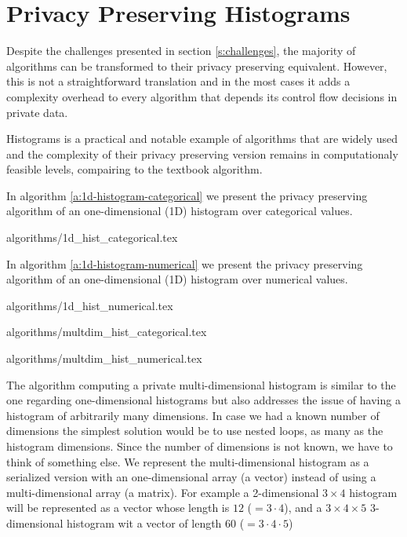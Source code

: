 \section{Privacy Preserving Histograms}\label{s:histograms}
Despite the challenges presented in section \ref{s:challenges}, the majority of algorithms can be transformed to their privacy preserving equivalent.
However, this is not a straightforward translation and in the most cases it adds a complexity overhead to every algorithm that depends its control flow decisions in private data.

Histograms is a practical and notable example of algorithms that are widely used and the complexity of their privacy preserving version remains in computationaly feasible levels, compairing to the textbook algorithm.







In algorithm \ref{a:1d-histogram-categorical} we present the privacy preserving algorithm of an one-dimensional (1D) histogram over categorical values.

{algorithms/1d_hist_categorical.tex}




In algorithm \ref{a:1d-histogram-numerical} we present the privacy preserving algorithm of an one-dimensional (1D) histogram over numerical values.

{algorithms/1d_hist_numerical.tex}




{algorithms/multdim_hist_categorical.tex}




{algorithms/multdim_hist_numerical.tex}

The algorithm computing a private multi-dimensional histogram is similar to the one regarding one-dimensional histograms but also addresses the issue of having a histogram of arbitrarily many dimensions.
In case we had a known number of dimensions the simplest solution would be to use nested loops, as many as the histogram dimensions.
Since the number of dimensions is not known, we have to think of something else.
We represent the multi-dimensional histogram as a serialized version with an one-dimensional array (a vector) instead of using a multi-dimensional array (a matrix).
For example a 2-dimensional $3 \times 4$ histogram will be represented as a vector whose length is $ 12 $ ($= 3 \cdot 4$), and a $3 \times 4 \times 5$ 3-dimensional histogram wit a vector of length $ 60 $ ($= 3 \cdot 4 \cdot 5$)


